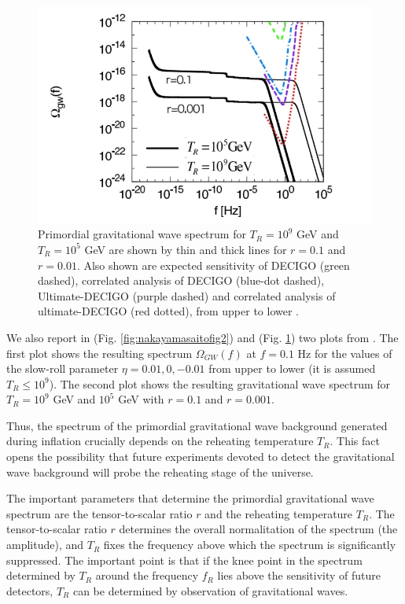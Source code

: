 \documentclass[11pt,a4paper,twoside]{book}
\begin{document}
\begin{figure}
	\centering
	\includegraphics[width=0.8\linewidth, height=0.3\textheight]{Images/Chap3/Nakayama_Saito_FirstPlot}
	\caption{Primordial gravitational wave spectrum for $ T_{R}=10^{9}$ GeV and $ T_{R}=10^{5}$ GeV are shown by thin and thick lines for $ r=0.1 $ and $ r=0.01 $. Also shown are expected sensitivity of DECIGO (green dashed), correlated analysis of DECIGO (blue-dot dashed), Ultimate-DECIGO (purple dashed) and correlated analysis of ultimate-DECIGO (red dotted), from upper to lower \cite{Chap3:ProibingReheatingTemperature2008}. }
	\label{fig:nakayamasaitofig3}
\end{figure}
We also report in (Fig. \ref{fig:nakayamasaitofig2}) and (Fig. \ref{fig:nakayamasaitofig3})   two plots from \cite{Chap3:ProibingReheatingTemperature2008}. The first plot shows the resulting spectrum $\Omega_{GW}(f)$ at $ f=0.1 $ Hz for the values of the slow-roll parameter $\eta = 0.01, 0, -0.01$  from upper to lower (it is assumed $ T_{R} \le  10^{9}$). The second plot shows the resulting gravitational wave spectrum for $ T_{R}=10^{9} $ GeV and $ 10^{5} $ GeV with $ r=0.1 $ and $ r=0.001 $. 

Thus, the spectrum of the primordial gravitational wave background generated during inflation crucially depends on the reheating temperature $ T_{R} $.  This fact opens the possibility that future experiments devoted to detect the gravitational wave background will probe the reheating stage of the universe.

The important parameters that determine the primordial gravitational wave spectrum are the tensor-to-scalar ratio $ r $ and the reheating temperature $ T_{R} $. The tensor-to-scalar ratio $ r $ determines the overall normalitation of the spectrum (the amplitude), and $ T_{R} $ fixes the frequency above which the spectrum is significantly suppressed. The important point is that if the knee point in the spectrum  determined by $ T_{R} $ around the frequency $ f_{R} $ lies above the sensitivity of future detectors, $ T_{R} $ can be determined by observation of gravitational waves.
\end{document}
